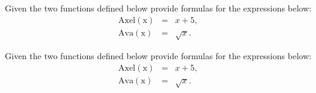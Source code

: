 \documentclass[12pt,addpoints]{exam}
\begin{document}
\begin{questions}


 \question Given the two functions defined below provide formulas for
   the expressions below:
   \begin{eqnarray*}
     \mathrm{Axel(x)} & = & x + 5, \\
     \mathrm{Ava(x)} & = & \sqrt{x}.
   \end{eqnarray*}


\clearpage

 \question Given the two functions defined below provide formulas for
   the expressions below:
   \begin{eqnarray*}
     \mathrm{Axel(x)} & = & x + 5, \\
     \mathrm{Ava(x)} & = & \sqrt{x}.
   \end{eqnarray*}
  \begin{parts}

\end{parts}
\end{questions}
\end{document}
